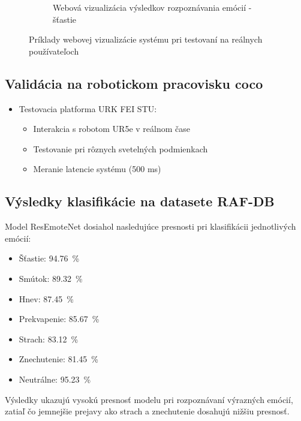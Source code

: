 \begin{figure}[!htpb]
\begin{subfigure}{0.48\textwidth}
        \caption{Webová vizualizácia výsledkov rozpoznávania emócií - šťastie}
    \end{subfigure}
    \caption{Príklady webovej vizualizácie systému pri testovaní na reálnych používateľoch}
    \label{fig:web_examples}
\end{figure}

\subsection{Validácia na robotickom pracovisku \gls{coco}}
    \begin{itemize}
\item Testovacia platforma URK FEI STU:
  \begin{itemize}
  \item Interakcia s robotom UR5e v reálnom čase
  \item Testovanie pri rôznych svetelných podmienkach
  \item Meranie latencie systému (500 ms)
  \end{itemize}
\end{itemize}

\subsection{Výsledky klasifikácie na datasete RAF-DB}
Model ResEmoteNet dosiahol nasledujúce presnosti pri klasifikácii jednotlivých emócií:
\begin{itemize}
    \item Šťastie: 94.76~\%
    \item Smútok: 89.32~\%
    \item Hnev: 87.45~\%
    \item Prekvapenie: 85.67~\%
    \item Strach: 83.12~\%
    \item Znechutenie: 81.45~\%
    \item Neutrálne: 95.23~\%
\end{itemize}

Výsledky ukazujú vysokú presnosť modelu pri rozpoznávaní výrazných emócií, zatiaľ čo jemnejšie prejavy ako strach a znechutenie dosahujú nižšiu presnosť.

